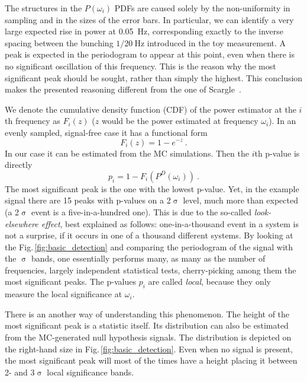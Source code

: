 The structures in the $P(\omega_i)$ PDFs are caused solely by the non-uniformity in sampling and in the sizes of the error bars. In particular, we can identify a very large expected rise in power at \SI{0.05}{\hertz}, corresponding exactly to the inverse spacing between the bunching $1 / \SI{20}{\hertz}$ introduced in the toy measurement. A peak is expected in the periodogram to appear at this point, even when there is no significant oscillation of this frequency. This is the reason why the most significant peak should be sought, rather than simply the highest. This conclusion makes the presented reasoning different from the one of Scargle~\cite{Scargle1982}.

We denote the cumulative density function (CDF) of the power estimator at the $i$th frequency as $F_i(z)$ ($z$ would be the power estimated at frequency $\omega_i$). In an evenly sampled, signal-free case it has a functional form
\begin{equation}
  F_i(z) = 1 - e^{-z} \ .
\end{equation}
In our case it can be estimated from the MC simulations. Then the $i$th p-value is directly
\begin{equation} \label{eq:local_p_value}
  p_i = 1 - F_i\left( P^D(\omega_i) \right) \ .
\end{equation}
The most significant peak is the one with the lowest p-value. Yet, in the example signal there are 15 peaks with p-values on a 2$\upsigma$ level, much more than expected (a 2$\upsigma$ event is a five-in-a-hundred one). This is due to the so-called \emph{look-elsewhere effect}, best explained as follows: one-in-a-thousand event in a system is not a surprise, if it occurs in one of a thousand different systems. By looking at the Fig.\,\ref{fig:basic_detection} and comparing the periodogram of the signal with the $\upsigma$ bands, one essentially performs many, as many as the number of frequencies, largely independent statistical tests, cherry-picking among them the most significant peaks. The p-values $p_i$ are called \emph{local}, because they only measure the local significance at $\omega_i$.

There is an another way of understanding this phenomenon. The height of the most significant peak is a statistic itself. Its distribution can also be estimated from the MC-generated null hypothesis signals. The distribution is depicted on the right-hand size in Fig.\,\ref{fig:basic_detection}. Even when no signal is present, the most significant peak will most of the times have a height placing it between 2- and 3$\upsigma$ local significance bands.

